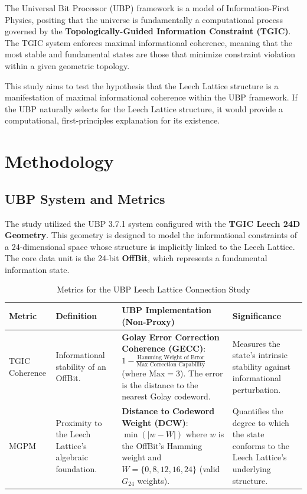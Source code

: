\documentclass[10pt, a4paper]{article}
\begin{document}
The Universal Bit Processor (UBP) framework is a model of Information-First Physics, positing that the universe is fundamentally a computational process governed by the \textbf{Topologically-Guided Information Constraint (TGIC)}. The TGIC system enforces maximal informational coherence, meaning that the most stable and fundamental states are those that minimize constraint violation within a given geometric topology.

This study aims to test the hypothesis that the Leech Lattice structure is a manifestation of maximal informational coherence within the UBP framework. If the UBP naturally selects for the Leech Lattice structure, it would provide a computational, first-principles explanation for its existence.

\section{Methodology}

\subsection{UBP System and Metrics}

The study utilized the UBP 3.7.1 system configured with the \textbf{TGIC Leech 24D Geometry}. This geometry is designed to model the informational constraints of a 24-dimensional space whose structure is implicitly linked to the Leech Lattice. The core data unit is the 24-bit \textbf{OffBit}, which represents a fundamental information state.

\begin{table}[h]
    \centering
    \caption{Metrics for the UBP Leech Lattice Connection Study}
    \label{tab:metrics}
    \begin{tabular}{llll}
        \toprule
        \textbf{Metric} & \textbf{Definition} & \textbf{UBP Implementation (Non-Proxy)} & \textbf{Significance} \\
        \midrule
        TGIC Coherence & Informational stability of an OffBit. & \textbf{Golay Error Correction Coherence (GECC)}: $1 - \frac{\text{Hamming Weight of Error}}{\text{Max Correction Capability}}$ (where $\text{Max}=3$). The error is the distance to the nearest Golay codeword. & Measures the state's intrinsic stability against informational perturbation. \\
        MGPM & Proximity to the Leech Lattice's algebraic foundation. & \textbf{Distance to Codeword Weight (DCW)}: $\min(|w - W|)$ where $w$ is the OffBit's Hamming weight and $W = \{0, 8, 12, 16, 24\}$ (valid $G_{24}$ weights). & Quantifies the degree to which the state conforms to the Leech Lattice's underlying structure. \\
        \bottomrule
    \end{tabular}
\end{table}
\end{document}

